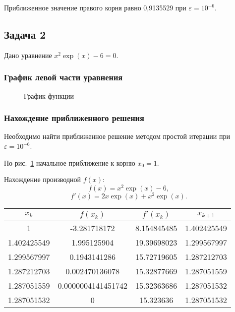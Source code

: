 \documentclass[10pt, a4paper, titlepage]{article}
\begin{document}
Приближенное значение правого корня равно 0,9135529 при $\varepsilon=10^{-6}$.

\subsection{Задача 2}

Дано уравнение $x^2\exp(x)-6=0$.

\subsubsection*{График левой части уравнения}
\begin{figure}[H]
    \centering
    \caption{График функции}
    \label{sr1Task2Function}
\end{figure}

\subsubsection*{Нахождение приближенного решения}

Необходимо найти приближенное решение методом простой итерации при $\varepsilon=10^{-6}$.

По рис.~\ref{sr1Task2Function} начальное приближение к корню $x_0=1$.

Нахождение производной $f(x)$: $$f(x)=x^2\exp(x)-6,$$ $$f'(x)=2x\exp(x)+x^2\exp(x).$$

\begin{center}
    \begin{tabular}{|c|c|c|c|}
        \hline
        $x_k$ & $f(x_k)$ & $f'(x_k)$ & $x_{k+1}$ \\ \hline
        
        1 & -3.281718172 & 8.154845485 & 1.402425549 \\ \hline
        
        1.402425549 & 1.995125904 & 19.39698023 & 1.299567997 \\ \hline
        
        1.299567997 & 0.1943141286 & 15.72719605 & 1.287212703 \\ \hline
        
        1.287212703 & 0.002470136078 & 15.32877669 & 1.287051559 \\ \hline
        
        1.287051559 & 0.0000004141451742 & 15.32363686 & 1.287051532 \\ \hline
        
        1.287051532 & 0 & 15.323636 & 1.287051532 \\ \hline
        
    \end{tabular}
\end{center}
\end{document}
